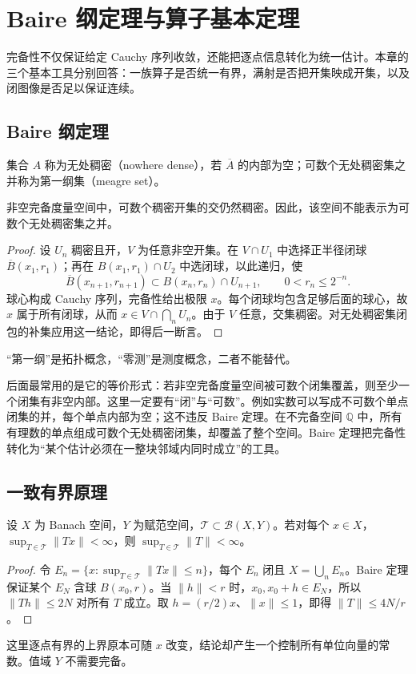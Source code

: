 \setcounter{chapter}{6} %
\chapter{Baire 纲定理与算子基本定理}
\label{chap:fa-baire}

完备性不仅保证给定 Cauchy 序列收敛，还能把逐点信息转化为统一估计。本章的三个基本工具分别回答：一族算子是否统一有界，满射是否把开集映成开集，以及闭图像是否足以保证连续。

\section{Baire 纲定理}
集合 $A$ 称为无处稠密（nowhere dense），若 $\overline A$ 的内部为空；可数个无处稠密集之并称为第一纲集（meagre set）。
\begin{theorem}\label{thm:fa-baire}
非空完备度量空间中，可数个稠密开集的交仍然稠密。因此，该空间不能表示为可数个无处稠密集之并。
\end{theorem}
\begin{proof}
设 $U_n$ 稠密且开，$V$ 为任意非空开集。在 $V\cap U_1$ 中选择正半径闭球 $\overline B(x_1,r_1)$；再在 $B(x_1,r_1)\cap U_2$ 中选闭球，以此递归，使
\[
 \overline B(x_{n+1},r_{n+1})\subset B(x_n,r_n)\cap U_{n+1},
 \qquad0<r_n\leq2^{-n}.
\]
球心构成 Cauchy 序列，完备性给出极限 $x$。每个闭球均包含足够后面的球心，故 $x$ 属于所有闭球，从而 $x\in V\cap\bigcap_nU_n$。由于 $V$ 任意，交集稠密。对无处稠密集闭包的补集应用这一结论，即得后一断言。
\end{proof}
“第一纲”是拓扑概念，“零测”是测度概念，二者不能替代。

后面最常用的是它的等价形式：若非空完备度量空间被可数个闭集覆盖，则至少一个闭集有非空内部。这里一定要有“闭”与“可数”。例如实数可以写成不可数个单点闭集的并，每个单点内部为空；这不违反 Baire 定理。在不完备空间 $\mathbb Q$ 中，所有有理数的单点组成可数个无处稠密闭集，却覆盖了整个空间。Baire 定理把完备性转化为“某个估计必须在一整块邻域内同时成立”的工具。

\section{一致有界原理}
\begin{theorem}\label{thm:fa-uniform-boundedness}
设 $X$ 为 Banach 空间，$Y$ 为赋范空间，$\mathcal T\subset\mathcal B(X,Y)$。若对每个 $x\in X$，$\sup_{T\in\mathcal T}\|Tx\|<\infty$，则 $\sup_{T\in\mathcal T}\|T\|<\infty$。
\end{theorem}
\begin{proof}
令 $E_n=\{x:\sup_{T\in\mathcal T}\|Tx\|\leq n\}$，每个 $E_n$ 闭且 $X=\bigcup_nE_n$。Baire 定理保证某个 $E_N$ 含球 $B(x_0,r)$。当 $\|h\|<r$ 时，$x_0,x_0+h\in E_N$，所以 $\|Th\|\leq2N$ 对所有 $T$ 成立。取 $h=(r/2)x$、$\|x\|\leq1$，即得 $\|T\|\leq4N/r$。
\end{proof}
这里逐点有界的上界原本可随 $x$ 改变，结论却产生一个控制所有单位向量的常数。值域 $Y$ 不需要完备。

